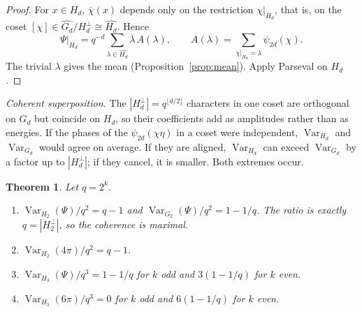 \documentclass[11pt,a4paper]{amsart}
\newtheorem{theorem}{Theorem}[section]
\theoremstyle{definition}
\theoremstyle{remark}
\newcommand{\Var}{\operatorname{Var}}
\begin{document}
\begin{proof}
For $x\in H_d$, $\overline\chi(x)$ depends only on the restriction $\chi|_{H_d}$, that is, on the coset
$[\chi]\in\widehat{G_d}/H_d^\perp\cong\widehat{H_d}$. Hence
\[
\Psi|_{H_d}=q^{-d}\sum_{\lambda\in\widehat{H_d}}\overline\lambda\,A(\lambda),\qquad
A(\lambda)=\sum_{\chi|_{H_d}=\lambda}\psi_{2d}(\chi).
\]
The trivial $\lambda$ gives the mean (Proposition~\ref{prop:mean}). Apply Parseval on $H_d$.
\end{proof}

\emph{Coherent superposition.} The $|H_d^\perp|=q^{\lfloor d/2\rfloor}$ characters in one coset are orthogonal on
$G_d$ but coincide on $H_d$, so their coefficients add as amplitudes rather than as energies. If the phases of the
$\psi_{2d}(\chi\eta)$ in a coset were independent, $\Var_{H_d}$ and $\Var_{G_d}$ would agree on average. If they are
aligned, $\Var_{H_d}$ can exceed $\Var_{G_d}$ by a factor up to $|H_d^\perp|$; if they cancel, it is smaller. Both
extremes occur.



\begin{theorem}\label{thm:var23}
Let $q=2^k$.
\begin{enumerate}
\item $\Var_{H_2}(\Psi)/q^2=q-1$ and $\Var_{G_2}(\Psi)/q^2=1-1/q$. The ratio is exactly $q=|H_2^\perp|$, so the
coherence is maximal.
\item $\Var_{H_2}(4\pi)/q^2=q-1$.
\item $\Var_{H_3}(\Psi)/q^3=1-1/q$ for $k$ odd and $3(1-1/q)$ for $k$ even.
\item $\Var_{H_3}(6\pi)/q^3=0$ for $k$ odd and $6(1-1/q)$ for $k$ even.
\end{enumerate}
\end{theorem}
\end{document}
